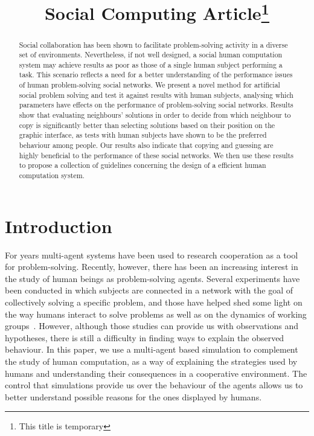 \documentclass{article}
\title{Social Computing Article\thanks{This title is temporary}}
\begin{document}
\maketitle

\begin{abstract}
Social collaboration has been shown to facilitate problem-solving activity in a diverse set of environments. Nevertheless, if not well designed, a social human computation system may achieve results as poor as those of a single human subject performing a task. This scenario reflects a need for a better understanding of the performance issues of human problem-solving social networks. We present a novel method for artificial social problem solving and test it against results with human subjects, analysing which parameters have effects on the performance of problem-solving social networks. Results show that evaluating neighbours' solutions in order to decide from which neighbour to copy is significantly better than selecting solutions based on their position on the graphic interface, as tests with human subjects have shown to be the preferred behaviour among people. Our results also indicate that copying and guessing are highly beneficial to the performance of these social networks. We then use these results to propose a collection of guidelines concerning the design of a efficient human computation system.
\end{abstract}

\section{Introduction}

For years multi-agent systems have been used to research cooperation as a tool for problem-solving. Recently, however, there has been an increasing interest in the study of human beings as problem-solving agents. Several experiments have been conducted in which subjects are connected in a network with the goal of collectively solving a specific problem, and those have helped shed some light on the way humans interact to solve problems as well as on the dynamics of working groups~\cite{woolley:evidencecollective}. However, although those studies can provide us with observations and hypotheses, there is still a difficulty in finding ways to explain the observed behaviour. In this paper, we use a multi-agent based simulation to complement the study of human computation, as a way of explaining the strategies used by humans and understanding their consequences in a cooperative environment. The control that simulations provide us over the behaviour of the agents allows us to better understand possible reasons for the ones displayed by humans.
\end{document}
